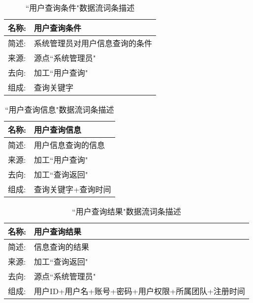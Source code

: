 \begin{table}[H]  
\caption{``用户查询条件"数据流词条描述}  
\begin{center}  
    \begin{tabular}{l p{11cm}} 
        \hline
        \quad 名称:  &   用户查询条件 \\
        \hline
        \quad 简述:  & 系统管理员对用户信息查询的条件 \\
        \hline
        \quad 来源:  & 源点``系统管理员" \\
        \hline
        \quad 去向:  & 加工``用户查询" \\
        \hline
        \quad 组成:  & 查询关键字 \\
        \hline
    \end{tabular}
    \label{tab1}
\end{center}
\end{table}

\begin{table}[H]  
\caption{``用户查询信息"数据流词条描述}  
\begin{center}  
    \begin{tabular}{l p{11cm}} 
        \hline
        \quad 名称:  &   用户查询信息 \\
        \hline
        \quad 简述:  & 用户信息查询的信息 \\
        \hline
        \quad 来源:  & 加工``用户查询" \\
        \hline
        \quad 去向:  & 加工``查询返回"\\
        \hline
        \quad 组成:  & 查询关键字+查询时间 \\
        \hline
    \end{tabular}
    \label{tab1}
\end{center}
\end{table}

\begin{table}[H]  
\caption{``用户查询结果"数据流词条描述}  
\begin{center}  
    \begin{tabular}{l p{11cm}} 
        \hline
        \quad 名称:  &   用户查询结果 \\
        \hline
        \quad 简述:  & 信息查询的结果 \\
        \hline
        \quad 来源:  & 加工``查询返回" \\
        \hline
        \quad 去向:  & 源点``系统管理员" \\
        \hline
        \quad 组成:  & 用户ID+用户名+账号+密码+用户权限+所属团队+注册时间 \\
        \hline
    \end{tabular}
    \label{tab1}
\end{center}
\end{table}


